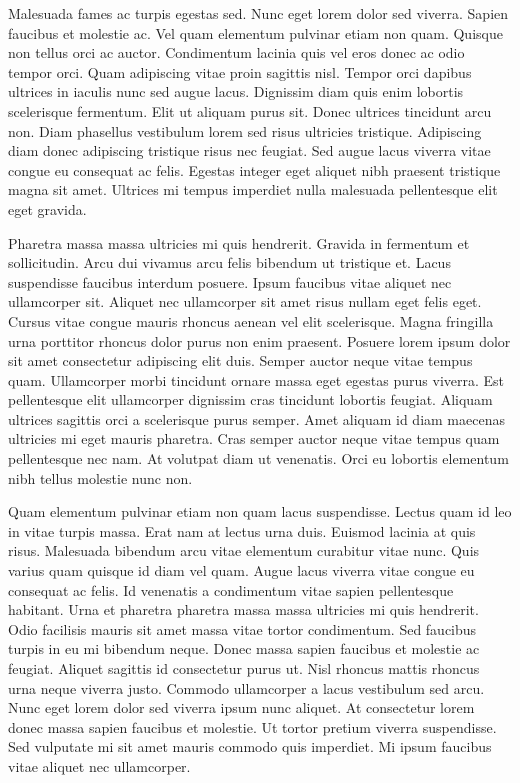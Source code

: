 \documentclass[]{tufte-handout}
\begin{document}
Malesuada fames ac turpis egestas sed. Nunc eget lorem dolor sed
viverra. Sapien faucibus et molestie ac. Vel quam elementum pulvinar
etiam non quam. Quisque non tellus orci ac auctor. Condimentum lacinia
quis vel eros donec ac odio tempor orci. Quam adipiscing vitae proin
sagittis nisl. Tempor orci dapibus ultrices in iaculis nunc sed augue
lacus. Dignissim diam quis enim lobortis scelerisque fermentum. Elit ut
aliquam purus sit. Donec ultrices tincidunt arcu non. Diam phasellus
vestibulum lorem sed risus ultricies tristique. Adipiscing diam donec
adipiscing tristique risus nec feugiat. Sed augue lacus viverra vitae
congue eu consequat ac felis. Egestas integer eget aliquet nibh praesent
tristique magna sit amet. Ultrices mi tempus imperdiet nulla malesuada
pellentesque elit eget gravida.

Pharetra massa massa ultricies mi quis hendrerit. Gravida in fermentum
et sollicitudin. Arcu dui vivamus arcu felis bibendum ut tristique et.
Lacus suspendisse faucibus interdum posuere. Ipsum faucibus vitae
aliquet nec ullamcorper sit. Aliquet nec ullamcorper sit amet risus
nullam eget felis eget. Cursus vitae congue mauris rhoncus aenean vel
elit scelerisque. Magna fringilla urna porttitor rhoncus dolor purus non
enim praesent. Posuere lorem ipsum dolor sit amet consectetur adipiscing
elit duis. Semper auctor neque vitae tempus quam. Ullamcorper morbi
tincidunt ornare massa eget egestas purus viverra. Est pellentesque elit
ullamcorper dignissim cras tincidunt lobortis feugiat. Aliquam ultrices
sagittis orci a scelerisque purus semper. Amet aliquam id diam maecenas
ultricies mi eget mauris pharetra. Cras semper auctor neque vitae tempus
quam pellentesque nec nam. At volutpat diam ut venenatis. Orci eu
lobortis elementum nibh tellus molestie nunc non.

Quam elementum pulvinar etiam non quam lacus suspendisse. Lectus quam id
leo in vitae turpis massa. Erat nam at lectus urna duis. Euismod lacinia
at quis risus. Malesuada bibendum arcu vitae elementum curabitur vitae
nunc. Quis varius quam quisque id diam vel quam. Augue lacus viverra
vitae congue eu consequat ac felis. Id venenatis a condimentum vitae
sapien pellentesque habitant. Urna et pharetra pharetra massa massa
ultricies mi quis hendrerit. Odio facilisis mauris sit amet massa vitae
tortor condimentum. Sed faucibus turpis in eu mi bibendum neque. Donec
massa sapien faucibus et molestie ac feugiat. Aliquet sagittis id
consectetur purus ut. Nisl rhoncus mattis rhoncus urna neque viverra
justo. Commodo ullamcorper a lacus vestibulum sed arcu. Nunc eget lorem
dolor sed viverra ipsum nunc aliquet. At consectetur lorem donec massa
sapien faucibus et molestie. Ut tortor pretium viverra suspendisse. Sed
vulputate mi sit amet mauris commodo quis imperdiet. Mi ipsum faucibus
vitae aliquet nec ullamcorper.
\end{document}
